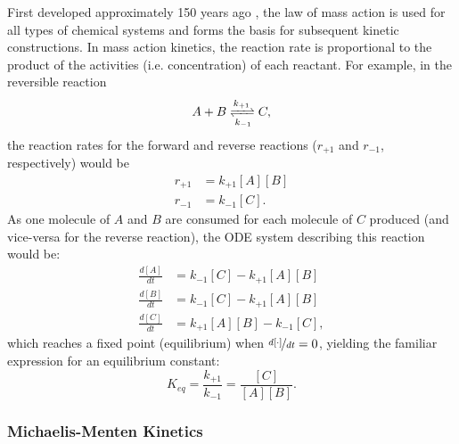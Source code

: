 First developed approximately 150 years ago \cite{Voit2015}, the law of mass action is used for all types of chemical systems and forms the basis for subsequent kinetic constructions. 
In mass action kinetics, the reaction rate is proportional to the product of the activities (i.e. concentration) of each reactant.
For example, in the reversible reaction
\[
  A + B \xrightleftharpoons[k_{-1}]{k_{+1}} C,
\]
the reaction rates for the forward and reverse reactions ($r_{+1}$ and $r_{-1}$, respectively) would be
\begin{align*}
  r_{+1} &= k_{+1}[A][B]\\
  r_{-1} &= k_{-1}[C].
\end{align*}
As one molecule of $A$ and $B$ are consumed for each molecule of $C$ produced (and vice-versa for the reverse reaction), the ODE system describing this reaction would be:
\begin{align*}
  \frac{d[A]}{dt} &= k_{-1}[C] - k_{+1}[A][B]\\
  \frac{d[B]}{dt} &= k_{-1}[C] - k_{+1}[A][B]\\
  \frac{d[C]}{dt} &= k_{+1}[A][B] - k_{-1}[C],
\end{align*}
which reaches a fixed point (equilibrium) when $\nicefrac{d[\cdot]}{dt} = 0$, yielding the familiar expression for an equilibrium constant:
\[
  K_{eq} = \frac{k_{+1}}{k_{-1}} = \frac{[C]}{[A][B]}.
\]

\subsubsection{Michaelis-Menten Kinetics}\label{sec:mmenten}

